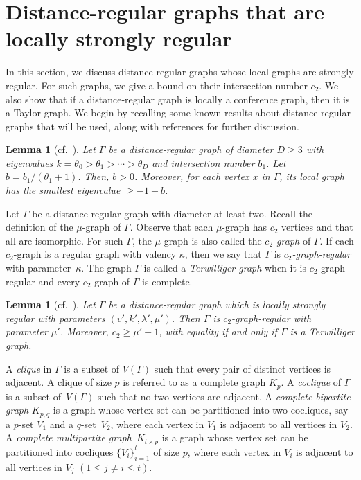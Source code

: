 \documentclass[11pt]{article}
\newtheorem{lemm}[theo]{Lemma}
\theoremstyle{definition}
\numberwithin{equation}{section}
\numberwithin{equation}{section}
\begin{document}
\section{Distance-regular graphs that are locally strongly regular}\label{sec:DRG locally SRG}
In this section, we discuss distance-regular graphs whose local graphs are strongly regular.
For such graphs, we give a bound on their intersection number $c_2$.
We also show that if a distance-regular graph is locally a conference graph, then it is a Taylor graph.
We begin by recalling some known results about distance-regular graphs that will be used, along with references for further discussion.


\begin{lemm}[{cf.~\cite[Theorem 4.4.3]{BCN}}]\label{lem:local min eig}
Let $\Gamma$ be a distance-regular graph of diameter $D\geqslant 3$ with eigenvalues $k=\theta_0 > \theta_1 >\cdots > \theta_D$ and intersection number $b_1$.
Let $b = b_1/(\theta_1+1)$.
Then, $b >0$.
Moreover, for each vertex $x$ in $\Gamma$, its local graph has the smallest eigenvalue $\geqslant -1-b$.
\end{lemm}


Let $\Gamma$ be a distance-regular graph with diameter at least two.
Recall the definition of the $\mu$-graph of $\Gamma$.
Observe that each $\mu$-graph has $c_2$ vertices and that all are isomorphic. 
For such $\Gamma$, the $\mu$-graph is also called the \emph{$c_2$-graph} of $\Gamma$.
If each $c_2$-graph is a regular graph with valency $\kappa$, then we say that $\Gamma$ is \emph{$c_2$-graph-regular} with parameter~$\kappa$.
The graph $\Gamma$ is called a \emph{Terwilliger graph} when it is $c_2$-graph-regular and every $c_2$-graph of $\Gamma$ is complete.

\begin{lemm}[{cf.~\cite[Theorem 3.1]{JK2000-2}}]\label{mu-regular}
Let $\Gamma$ be a distance-regular graph which is locally strongly regular with parameters $(v',k',\lambda', \mu')$. 
Then $\Gamma$ is $c_2$-graph-regular with parameter $\mu'$.
Moreover, $c_2 \geqslant \mu'+1$, with equality if and only if $\Gamma$ is a Terwilliger graph.
\end{lemm}

A \emph{clique} in $\Gamma$ is a subset of $V(\Gamma)$ such that every pair of distinct vertices is adjacent. A clique of size $p$ is referred to as a complete graph $K_p$.
A \emph{coclique} of $\Gamma$ is a subset of~$V(\Gamma)$ such that no two vertices are adjacent. 
A \emph{complete bipartite graph} $K_{p,q}$ is a graph whose vertex set can be partitioned into two cocliques, say a $p$-set $V_1$ and a $q$-set~$V_2$, where each vertex in $V_1$ is adjacent to all vertices in $V_2$.
A \emph{complete multipartite graph}~$K_{t \times p}$ is a graph whose vertex set can be partitioned into cocliques $\{V_i\}^t_{i=1}$ of size $p$, where each vertex in $V_i$ is adjacent to all vertices in $V_j$ $(1\leq j\ne i \leq t)$.
\end{document}
